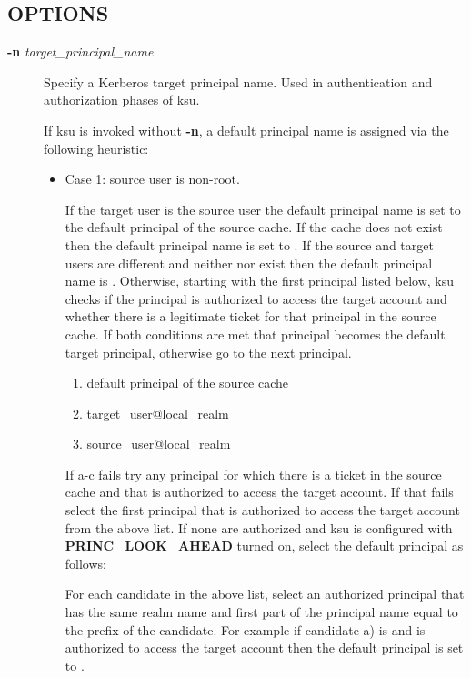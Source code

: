 \documentclass[letterpaper,10pt,english]{sphinxmanual}
\begin{document}
\subsection{OPTIONS}
\label{user/user_commands/ksu:options}\begin{description}
\item[{\textbf{-n} \emph{target\_principal\_name}}] \leavevmode
Specify a Kerberos target principal name.  Used in authentication
and authorization phases of ksu.

If ksu is invoked without \textbf{-n}, a default principal name is
assigned via the following heuristic:
\begin{itemize}
\item {} 
Case 1: source user is non-root.

If the target user is the source user the default principal name
is set to the default principal of the source cache.  If the
cache does not exist then the default principal name is set to
.  If the source and target users are
different and neither  nor
 exist then the default principal name
is .  Otherwise, starting
with the first principal listed below, ksu checks if the
principal is authorized to access the target account and whether
there is a legitimate ticket for that principal in the source
cache.  If both conditions are met that principal becomes the
default target principal, otherwise go to the next principal.
\begin{enumerate}
\item {} 
default principal of the source cache

\item {} 
target\_user@local\_realm

\item {} 
source\_user@local\_realm

\end{enumerate}

If a-c fails try any principal for which there is a ticket in
the source cache and that is authorized to access the target
account.  If that fails select the first principal that is
authorized to access the target account from the above list.  If
none are authorized and ksu is configured with
\textbf{PRINC\_LOOK\_AHEAD} turned on, select the default principal as
follows:

For each candidate in the above list, select an authorized
principal that has the same realm name and first part of the
principal name equal to the prefix of the candidate.  For
example if candidate a) is  and
 is authorized to access the target
account then the default principal is set to
.


\end{itemize}
\end{description}
\end{document}
